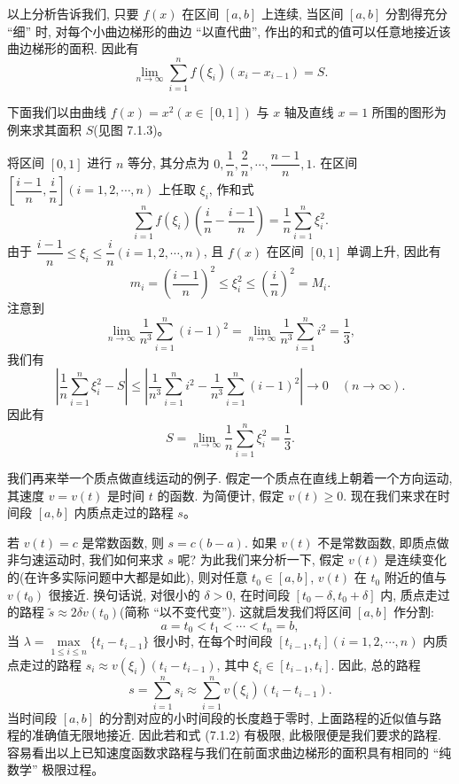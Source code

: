 \documentclass[UTF8, 12pt, fontset=fandol, oneside]{ctexart}
\begin{document}
以上分析告诉我们, 只要 $f(x)$ 在区间 $[a,b]$ 上连续, 当区间 $[a,b]$ 分割得充分 ``细'' 时, 对每个小曲边梯形的曲边 ``以直代曲'', 作出的和式的值可以任意地接近该曲边梯形的面积. 因此有
\[
  \lim_{n\to\infty}\sum_{i=1}^n f(\xi_i)(x_i-x_{i-1})=S.
\]

下面我们以由曲线 $f(x)=x^2(x\in[0,1])$ 与 $x$ 轴及直线 $x=1$ 所围的图形为例来求其面积 $S$(见图 7.1.3)。

将区间 $[0,1]$ 进行 $n$ 等分, 其分点为 $0,\dfrac1n,\dfrac2n,\cdots,\dfrac{n-1}{n},1$. 在区间 $\left[\dfrac{i-1}{n},\dfrac{i}{n}\right](i=1,2,\cdots,n)$ 上任取 $\xi_i$, 作和式
\[
  \sum_{i=1}^n f(\xi_i)\left(\frac{i}{n}-\frac{i-1}{n}\right)
  =\frac1n\sum_{i=1}^n \xi_i^2.
\]
由于 $\dfrac{i-1}{n}\leq \xi_i\leq \dfrac{i}{n}(i=1,2,\cdots,n)$, 且 $f(x)$ 在区间 $[0,1]$ 单调上升, 因此有
\[
  m_i=\left(\frac{i-1}{n}\right)^2\leq \xi_i^2\leq \left(\frac{i}{n}\right)^2=M_i.
\]
注意到
\[
  \lim_{n\to\infty}\frac1{n^3}\sum_{i=1}^n (i-1)^2
  =\lim_{n\to\infty}\frac1{n^3}\sum_{i=1}^n i^2
  =\frac13,
\]
我们有
\[
  \left|\frac1n\sum_{i=1}^n \xi_i^2-S\right|
  \leq \left|\frac1{n^3}\sum_{i=1}^n i^2-\frac1{n^3}\sum_{i=1}^n (i-1)^2\right|
  \to 0\quad(n\to\infty).
\]
因此有
\[
  S=\lim_{n\to\infty}\frac1n\sum_{i=1}^n \xi_i^2=\frac13.
\]

我们再来举一个质点做直线运动的例子. 假定一个质点在直线上朝着一个方向运动, 其速度 $v=v(t)$ 是时间 $t$ 的函数. 为简便计, 假定 $v(t)\geq 0$. 现在我们来求在时间段 $[a,b]$ 内质点走过的路程 $s$。

若 $v(t)=c$ 是常数函数, 则 $s=c(b-a)$. 如果 $v(t)$ 不是常数函数, 即质点做非匀速运动时, 我们如何来求 $s$ 呢? 为此我们来分析一下, 假定 $v(t)$ 是连续变化的(在许多实际问题中大都是如此), 则对任意 $t_0\in[a,b]$, $v(t)$ 在 $t_0$ 附近的值与 $v(t_0)$ 很接近. 换句话说, 对很小的 $\delta>0$, 在时间段 $[t_0-\delta,t_0+\delta]$ 内, 质点走过的路程 $\tilde s\approx 2\delta v(t_0)$(简称 ``以不变代变''). 这就启发我们将区间 $[a,b]$ 作分割:
\[
  a=t_0<t_1<\cdots<t_n=b,
\]
当 $\lambda=\max\limits_{1\leq i\leq n}\{t_i-t_{i-1}\}$ 很小时, 在每个时间段 $[t_{i-1},t_i](i=1,2,\cdots,n)$ 内质点走过的路程 $s_i\approx v(\xi_i)(t_i-t_{i-1})$, 其中 $\xi_i\in[t_{i-1},t_i]$. 因此, 总的路程
\begin{equation}
  s=\sum_{i=1}^n s_i\approx \sum_{i=1}^n v(\xi_i)(t_i-t_{i-1}).
  \tag{7.1.2}
\end{equation}
当时间段 $[a,b]$ 的分割对应的小时间段的长度趋于零时, 上面路程的近似值与路程的准确值无限地接近. 因此若和式 (7.1.2) 有极限, 此极限便是我们要求的路程. 容易看出以上已知速度函数求路程与我们在前面求曲边梯形的面积具有相同的 ``纯数学'' 极限过程。
\end{document}
